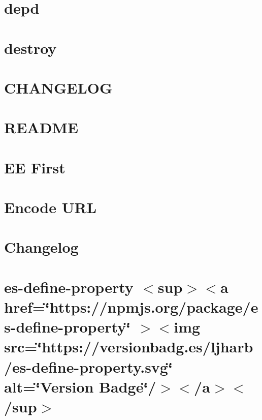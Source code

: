 \documentclass[twoside]{book}
\newcommand{\+}{\discretionary{\mbox{\scriptsize$\hookleftarrow$}}{}{}}
\begin{document}
\chapter{depd}
\label{md_Backend_nodejs_node_modules_depd_Readme}

\chapter{destroy}
\label{md_Backend_nodejs_node_modules_destroy_README}

\chapter{CHANGELOG}
\label{md_Backend_nodejs_node_modules_doctrine_CHANGELOG}

\chapter{README}
\label{md_Backend_nodejs_node_modules_doctrine_README}

\chapter{EE First}
\label{md_Backend_nodejs_node_modules_ee_first_README}

\chapter{Encode URL}
\label{md_Backend_nodejs_node_modules_encodeurl_README}

\chapter{Changelog}
\label{md_Backend_nodejs_node_modules_es_define_property_CHANGELOG}

\chapter{es-\/define-\/property \texorpdfstring{$<$}{<}sup\texorpdfstring{$>$}{>}\texorpdfstring{$<$}{<}a href=\char`\"{}https\+://npmjs.\+org/package/es-\/define-\/property\char`\"{} \texorpdfstring{$>$}{>}\texorpdfstring{$<$}{<}img src=\char`\"{}https\+://versionbadg.\+es/ljharb/es-\/define-\/property.\+svg\char`\"{} alt=\char`\"{}\+Version Badge\char`\"{}/\texorpdfstring{$>$}{>}\texorpdfstring{$<$}{<}/a\texorpdfstring{$>$}{>}\texorpdfstring{$<$}{<}/sup\texorpdfstring{$>$}{>}}
\label{md_Backend_nodejs_node_modules_es_define_property_README}

\end{document}
